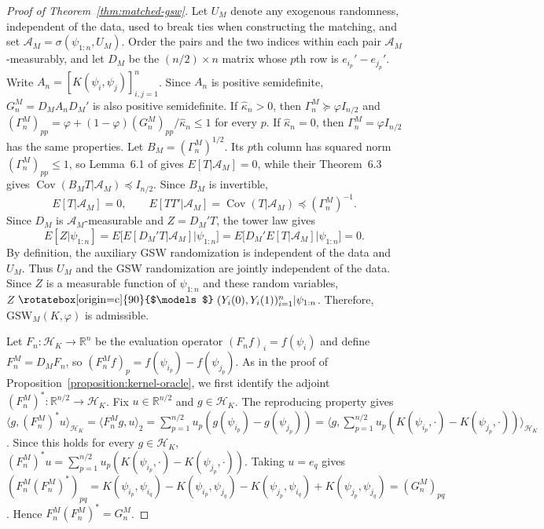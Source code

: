 \documentclass[letterpaper,12pt]{article}
\theoremstyle{definition}
\numberwithin{equation}{section}
\newcommand{\mr}{\mathbb{R}}
\newcommand{\mc}{\mathcal}
\newcommand{\indep}{\mathrel{\raisebox{0.05em}{\rotatebox[origin=c]{90}{$\models$}}}}
\DeclareMathOperator{\cov}{Cov}
\begin{document}
\begin{proof}[Proof of Theorem~\ref{thm:matched-gsw}]
Let $U_M$ denote any exogenous randomness, independent of the data, used to break ties when constructing the matching, and set $\mc A_M=\sigma(\psi_{1:n},U_M)$.
Order the pairs and the two indices within each pair $\mc A_M$-measurably, and let $D_M$ be the $(n/2)\times n$ matrix whose $p$th row is $e_{i_p}'-e_{j_p}'$.
Write $A_n=[K(\psi_i,\psi_j)]_{i,j=1}^n$. Since $A_n$ is positive semidefinite, $G_n^M=D_MA_nD_M'$ is also positive semidefinite.
If $\widehat\kappa_n>0$, then $\Gamma_n^M\succeq\varphi I_{n/2}$ and $(\Gamma_n^M)_{pp}=\varphi+(1-\varphi)(G_n^M)_{pp}/\widehat\kappa_n\leq1$ for every $p$.
If $\widehat\kappa_n=0$, then $\Gamma_n^M=\varphi I_{n/2}$ has the same properties.
Let $B_M=(\Gamma_n^M)^{1/2}$.
Its $p$th column has squared norm $(\Gamma_n^M)_{pp}\leq1$, so Lemma~6.1 of \citet{harshaw2024gsw} gives $E[T|\mc A_M]=0$, while their Theorem~6.3 gives $\cov(B_MT|\mc A_M)\preceq I_{n/2}$.
Since $B_M$ is invertible,
\begin{equation}\label{equation:proof-matched-gsw-covariance}
E[T|\mc A_M]=0, \qquad E[TT'|\mc A_M]=\cov(T|\mc A_M)\preceq(\Gamma_n^M)^{-1}.
\end{equation}
Since $D_M$ is $\mc A_M$-measurable and $Z=D_M'T$, the tower law gives
\begin{equation*}
E[Z|\psi_{1:n}]=E\big[E[D_M'T|\mc A_M]\big|\psi_{1:n}\big]=E\big[D_M'E[T|\mc A_M]\big|\psi_{1:n}\big]=0.
\end{equation*}
By definition, the auxiliary GSW randomization is independent of the data and $U_M$.
Thus $U_M$ and the GSW randomization are jointly independent of the data.
Since $Z$ is a measurable function of $\psi_{1:n}$ and these random variables, $Z\indep(Y_i(0),Y_i(1))_{i=1}^n|\psi_{1:n}$.
Therefore, $\mathrm{GSW}_M(K,\varphi)$ is admissible.

Let $F_n:\mc H_K\to\mr^n$ be the evaluation operator $(F_nf)_i=f(\psi_i)$ and define $F_n^M=D_MF_n$, so $(F_n^Mf)_p=f(\psi_{i_p})-f(\psi_{j_p})$.
As in the proof of Proposition~\ref{proposition:kernel-oracle}, we first identify the adjoint $(F_n^M)^*:\mr^{n/2}\to\mc H_K$.
Fix $u\in\mr^{n/2}$ and $g\in\mc H_K$.
The reproducing property gives $\langle g,(F_n^M)^*u\rangle_{\mc H_K}=\langle F_n^Mg,u\rangle_2=\sum_{p=1}^{n/2}u_p(g(\psi_{i_p})-g(\psi_{j_p}))=\langle g,\sum_{p=1}^{n/2}u_p(K(\psi_{i_p},\cdot)-K(\psi_{j_p},\cdot))\rangle_{\mc H_K}$.
Since this holds for every $g\in\mc H_K$, $(F_n^M)^*u=\sum_{p=1}^{n/2}u_p(K(\psi_{i_p},\cdot)-K(\psi_{j_p},\cdot))$.
Taking $u=e_q$ gives $(F_n^M(F_n^M)^*)_{pq}=K(\psi_{i_p},\psi_{i_q})-K(\psi_{i_p},\psi_{j_q})-K(\psi_{j_p},\psi_{i_q})+K(\psi_{j_p},\psi_{j_q})=(G_n^M)_{pq}$.
Hence $F_n^M(F_n^M)^*=G_n^M$.


\end{proof}
\end{document}
